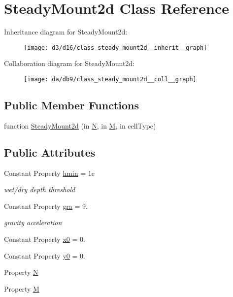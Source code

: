 \hypertarget{class_steady_mount2d}{}\section{Steady\+Mount2d Class Reference}
\label{class_steady_mount2d}


Inheritance diagram for Steady\+Mount2d\+:
\nopagebreak
\begin{figure}[H]
\begin{center}
\leavevmode
\texttt{[image: d3/d16/class\_steady\_mount2d\_\_inherit\_\_graph]}
\end{center}
\end{figure}


Collaboration diagram for Steady\+Mount2d\+:
\nopagebreak
\begin{figure}[H]
\begin{center}
\leavevmode
\texttt{[image: da/db9/class\_steady\_mount2d\_\_coll\_\_graph]}
\end{center}
\end{figure}
\subsection*{Public Member Functions}
\begin{DoxyCompactItemize}
\item 
function \hyperlink{class_steady_mount2d_ab76a1f55712afe0bed8092ca8813e93c}{Steady\+Mount2d} (in \hyperlink{class_steady_mount2d_ac3443a8e75ae838f0212f2d648c168c4}{N}, in \hyperlink{class_steady_mount2d_a673d2d7065f2593ca3b74820c6ced410}{M}, in cell\+Type)
\end{DoxyCompactItemize}
\subsection*{Public Attributes}
\begin{DoxyCompactItemize}
\item 
Constant Property \hyperlink{class_steady_mount2d_ac94a8265be7e864ccf29834557c732df}{hmin} = 1e
\begin{DoxyCompactList}\small\item\em wet/dry depth threshold \end{DoxyCompactList}\item 
Constant Property \hyperlink{class_steady_mount2d_a971f75815bf75b0f94b6d71c1b675c05}{gra} = 9.
\begin{DoxyCompactList}\small\item\em gravity acceleration \end{DoxyCompactList}\item 
Constant Property \hyperlink{class_steady_mount2d_aa4a366c7ec5981f5588efbbd4669b56e}{x0} = 0.
\item 
Constant Property \hyperlink{class_steady_mount2d_afeec43a762fb06dee2b0d30f9da5d286}{y0} = 0.
\item 
Property \hyperlink{class_steady_mount2d_ac3443a8e75ae838f0212f2d648c168c4}{N}
\item 
Property \hyperlink{class_steady_mount2d_a673d2d7065f2593ca3b74820c6ced410}{M}
\end{DoxyCompactItemize}
